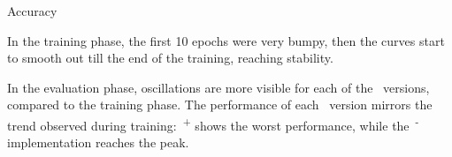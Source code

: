 \begin{subsection}{Accuracy}
    \begin{figure}[h!]
        \centering
        \begin{subfigure}[b]{0.48\textwidth}
            \centering
            
            \label{fig:training_accuracy}
        \end{subfigure}
        \hfill
        \begin{subfigure}[b]{0.48\textwidth}
            \centering
            
            \label{fig:evaluation_accuracy}
        \end{subfigure}
    \end{figure}
    \par In the training phase, the first 10 epochs were very bumpy, then the curves start to smooth out till the end of the training, reaching stability.\\

    \par In the evaluation phase, oscillations are more visible for each of the~ versions, compared to the training phase. The performance of each~ version mirrors the trend observed during training:~\textsuperscript{+} shows the worst performance, while the~\textsuperscript{-} implementation reaches the peak.
\end{subsection}